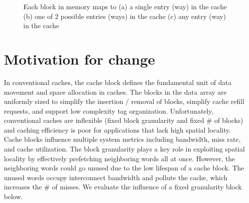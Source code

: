 \begin{figure}[h]
  \caption[Cache Associativity]{ Each block in memory maps to (a) a single entry (way) in the cache (b) one of 2 possible entries (ways) in the cache (c) any entry (way) in the cache}
  \label{fig:cache_associativity}
\end{figure}

\section{Motivation for change}

In conventional caches, the cache block defines the fundamental unit of data
movement and space allocation in caches. The blocks in the data array are
uniformly sized to simplify the insertion / removal of blocks, simplify cache
refill requests, and support low complexity tag organization. Unfortunately,
conventional caches are inflexible (fixed block granularity and fixed \# of
blocks) and caching efficiency is poor for applications that lack high spatial
locality.  Cache blocks influence multiple system metrics including bandwidth,
miss rate, and cache utilization. The block granularity plays a key role in
exploiting spatial locality by effectively prefetching neighboring words all
at once. However, the neighboring words could go unused due to the low
lifespan of a cache block. The unused words occupy interconnect bandwidth and
pollute the cache, which increases the \# of misses. We evaluate the influence
of a fixed granularity block below.

